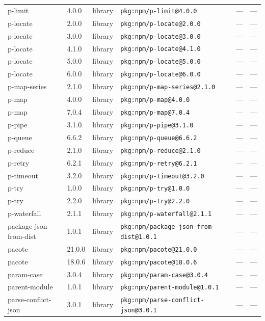 \documentclass[11pt]{article}
\begin{document}
\begin{longtable}{|l|l|l|p{2.2cm}|l|p{4cm}|}
p-limit & 4.0.0 & library & \texttt{pkg:npm/p-limit@4.0.0} & — & — \\
p-locate & 2.0.0 & library & \texttt{pkg:npm/p-locate@2.0.0} & — & — \\
p-locate & 3.0.0 & library & \texttt{pkg:npm/p-locate@3.0.0} & — & — \\
p-locate & 4.1.0 & library & \texttt{pkg:npm/p-locate@4.1.0} & — & — \\
p-locate & 5.0.0 & library & \texttt{pkg:npm/p-locate@5.0.0} & — & — \\
p-locate & 6.0.0 & library & \texttt{pkg:npm/p-locate@6.0.0} & — & — \\
p-map-series & 2.1.0 & library & \texttt{pkg:npm/p-map-series@2.1.0} & — & — \\
p-map & 4.0.0 & library & \texttt{pkg:npm/p-map@4.0.0} & — & — \\
p-map & 7.0.4 & library & \texttt{pkg:npm/p-map@7.0.4} & — & — \\
p-pipe & 3.1.0 & library & \texttt{pkg:npm/p-pipe@3.1.0} & — & — \\
p-queue & 6.6.2 & library & \texttt{pkg:npm/p-queue@6.6.2} & — & — \\
p-reduce & 2.1.0 & library & \texttt{pkg:npm/p-reduce@2.1.0} & — & — \\
p-retry & 6.2.1 & library & \texttt{pkg:npm/p-retry@6.2.1} & — & — \\
p-timeout & 3.2.0 & library & \texttt{pkg:npm/p-timeout@3.2.0} & — & — \\
p-try & 1.0.0 & library & \texttt{pkg:npm/p-try@1.0.0} & — & — \\
p-try & 2.2.0 & library & \texttt{pkg:npm/p-try@2.2.0} & — & — \\
p-waterfall & 2.1.1 & library & \texttt{pkg:npm/p-waterfall@2.1.1} & — & — \\
package-json-from-dist & 1.0.1 & library & \texttt{pkg:npm/package-json-from-dist@1.0.1} & — & — \\
pacote & 21.0.0 & library & \texttt{pkg:npm/pacote@21.0.0} & — & — \\
pacote & 18.0.6 & library & \texttt{pkg:npm/pacote@18.0.6} & — & — \\
param-case & 3.0.4 & library & \texttt{pkg:npm/param-case@3.0.4} & — & — \\
parent-module & 1.0.1 & library & \texttt{pkg:npm/parent-module@1.0.1} & — & — \\
parse-conflict-json & 3.0.1 & library & \texttt{pkg:npm/parse-conflict-json@3.0.1} & — & — \\

\end{longtable}
\end{document}
